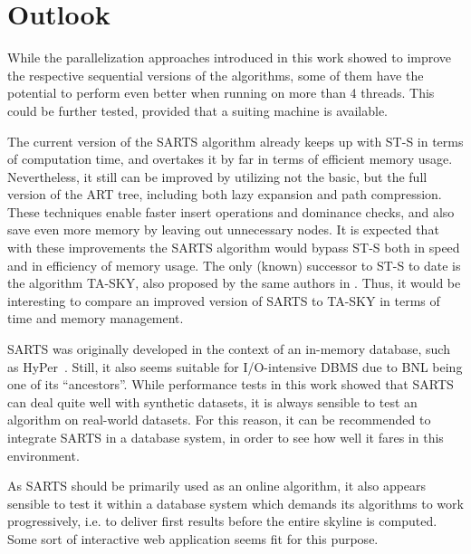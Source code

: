 \section{Outlook}
While the parallelization approaches introduced in this work showed to improve the respective sequential versions of the algorithms, some of them have the potential to perform even better when running on more than 4 threads. This could be further tested, provided that a suiting machine is available. 

The current version of the SARTS algorithm already keeps up with ST-S in terms of computation time, and overtakes it by far in terms of efficient memory usage. Nevertheless, it still can be improved by utilizing not the basic, but the full version of the ART tree, including both lazy expansion and path compression. These techniques enable faster insert operations and dominance checks, and also save even more memory by leaving out unnecessary nodes. It is expected that with these improvements the SARTS algorithm would bypass ST-S both in speed and in efficiency of memory usage. The only (known) successor to ST-S to date is the algorithm TA-SKY, also proposed by the same authors in \cite{rahman}. Thus, it would be interesting to compare an improved version of SARTS to TA-SKY in terms of time and memory management. 

SARTS was originally developed in the context of an in-memory database, such as HyPer~\cite{hyper}. Still, it also seems suitable for I/O-intensive DBMS due to BNL being one of its ``ancestors''. While performance tests in this work showed that SARTS can deal quite well with synthetic datasets, it is always sensible to test an algorithm on real-world datasets. For this reason, it can be recommended to integrate SARTS in a database system, in order to see how well it fares in this environment. 

As SARTS should be primarily used as an online algorithm, it also appears sensible to test it within a database system which demands its algorithms to work progressively, i.e. to deliver first results before the entire skyline is computed. Some sort of interactive web application seems fit for this purpose. 